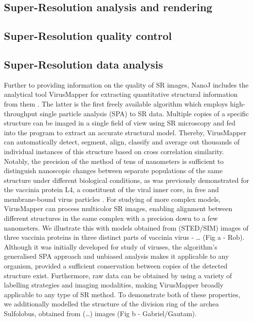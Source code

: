 \subsection*{Super-Resolution analysis and rendering}
\Blindtext

\subsection*{Super-Resolution quality control}
\Blindtext

\subsection*{Super-Resolution data analysis}
Further to providing information on the quality of SR images, NanoJ includes the analytical tool VirusMapper for extracting quantitative structural information from them \cite{gray2016virus,gray2017}. The latter is the first freely available algorithm which employs high-throughput single particle analysis (SPA) to SR data. Multiple copies of a specific structure can be imaged in a single field of view using SR microscopy and fed into the program to extract an accurate structural model. Thereby, VirusMapper can automatically detect, segment, align, classify and average out thousands of individual instances of this structure based on cross correlation similarity. Notably, the precision of the method of tens of nanometers is sufficient to distinguish nanoscopic changes between separate populations of the same structure under different biological conditions, as was previously demonstrated for the vaccinia protein L4, a constituent of the viral inner core, in free and membrane-bound virus particles \cite{gray2016virus}. For studying of more complex models, VirusMapper can process multicolor SR images, enabling alignment between different structures in the same complex with a precision down to a few nanometers. We illustrate this with models obtained from (STED/SIM) images of three vaccinia proteins in three distinct parts of vaccinia virus - … (Fig a - Rob). 
\newline
Although it was initially developed for study of viruses, the algorithm’s generalised SPA approach and unbiased analysis makes it applicable to any organism, provided a sufficient conservation between copies of the detected structure exist. Furthermore, raw data can be obtained by using a variety of labelling strategies and imaging modalities, making VirusMapper broadly applicable to any type of SR method. To demonstrate both of these properties, we additionally modelled the structure of the division ring of the archea Sulfolobus, obtained from (…) images (Fig b - Gabriel/Gautam). 

